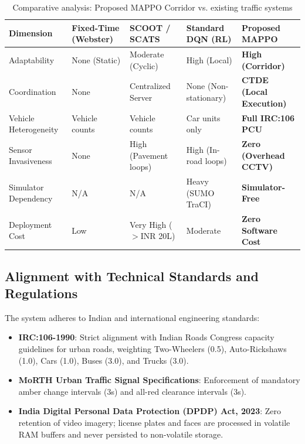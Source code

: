 \documentclass[12pt,a4paper,oneside]{report}
\begin{document}
\begin{table}[htbp]
\centering
\scriptsize
\setlength{\tabcolsep}{3pt}
\caption{Comparative analysis: Proposed MAPPO Corridor vs. existing traffic systems}
\label{tab:ch5_competitive_comparison}
\begin{tabularx}{\textwidth}{|p{2.2cm}|p{2.0cm}|p{2.0cm}|p{2.2cm}|X|}
\hline
\textbf{Dimension} & \textbf{Fixed-Time (Webster)} & \textbf{SCOOT / SCATS} & \textbf{Standard DQN (RL)} & \textbf{Proposed MAPPO} \\ \hline
Adaptability & None (Static) & Moderate (Cyclic) & High (Local) & \textbf{High (Corridor)} \\ \hline
Coordination & None & Centralized Server & None (Non-stationary) & \textbf{CTDE (Local Execution)} \\ \hline
Vehicle Heterogeneity & Vehicle counts & Vehicle counts & Car units only & \textbf{Full IRC:106 PCU} \\ \hline
Sensor Invasiveness & None & High (Pavement loops) & High (In-road loops) & \textbf{Zero (Overhead CCTV)} \\ \hline
Simulator Dependency & N/A & N/A & Heavy (SUMO TraCI) & \textbf{Simulator-Free} \\ \hline
Deployment Cost & Low & Very High ($>$INR 20L) & Moderate & \textbf{Zero Software Cost} \\ \hline
\end{tabularx}
\end{table}

\subsection{Alignment with Technical Standards and Regulations}
The system adheres to Indian and international engineering standards:
\begin{itemize}
    \item \textbf{IRC:106-1990}: Strict alignment with Indian Roads Congress capacity guidelines for urban roads, weighting Two-Wheelers (0.5), Auto-Rickshaws (1.0), Cars (1.0), Buses (3.0), and Trucks (3.0).
    \item \textbf{MoRTH Urban Traffic Signal Specifications}: Enforcement of mandatory amber change intervals (3s) and all-red clearance intervals (3s).
    \item \textbf{India Digital Personal Data Protection (DPDP) Act, 2023}: Zero retention of video imagery; license plates and faces are processed in volatile RAM buffers and never persisted to non-volatile storage.
\end{itemize}
\end{document}
